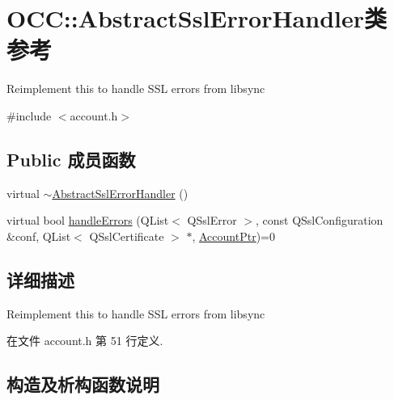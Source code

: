 \hypertarget{class_o_c_c_1_1_abstract_ssl_error_handler}{}\section{O\+CC\+:\+:Abstract\+Ssl\+Error\+Handler类 参考}
\label{class_o_c_c_1_1_abstract_ssl_error_handler}


Reimplement this to handle S\+SL errors from libsync  




{\ttfamily \#include $<$account.\+h$>$}

\subsection*{Public 成员函数}
\begin{DoxyCompactItemize}
\item 
virtual \hyperlink{class_o_c_c_1_1_abstract_ssl_error_handler_af2aaa8be378bfe9dd9fbdc83f8597667}{$\sim$\+Abstract\+Ssl\+Error\+Handler} ()
\item 
virtual bool \hyperlink{class_o_c_c_1_1_abstract_ssl_error_handler_a7cb32ea0a130998ce6646f6d2e13bc2f}{handle\+Errors} (Q\+List$<$ Q\+Ssl\+Error $>$, const Q\+Ssl\+Configuration \&conf, Q\+List$<$ Q\+Ssl\+Certificate $>$ $\ast$, \hyperlink{namespace_o_c_c_a848616aedb9188e223c6b9867757fe69}{Account\+Ptr})=0
\end{DoxyCompactItemize}


\subsection{详细描述}
Reimplement this to handle S\+SL errors from libsync 

在文件 account.\+h 第 51 行定义.



\subsection{构造及析构函数说明}
\mbox{\label{class_o_c_c_1_1_abstract_ssl_error_handler_af2aaa8be378bfe9dd9fbdc83f8597667}} 
